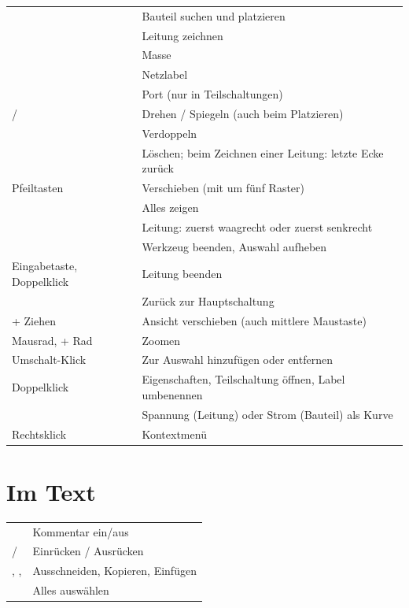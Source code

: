 \begin{tabularx}{\textwidth}{@{}P{4.5cm}L@{}}
  \toprule
   & Bauteil suchen und platzieren \\
   & Leitung zeichnen \\
   & Masse \\
   & Netzlabel \\
   & Port (nur in Teilschaltungen) \\
   /  & Drehen / Spiegeln (auch beim Platzieren) \\
   & Verdoppeln \\
   & Löschen; beim Zeichnen einer Leitung: letzte Ecke zurück \\
  Pfeiltasten & Verschieben (mit  um fünf Raster) \\
   & Alles zeigen \\
  \taste{/} & Leitung: zuerst waagrecht oder zuerst senkrecht \\
   & Werkzeug beenden, Auswahl aufheben \\
  Eingabetaste, Doppelklick & Leitung beenden \\
   & Zurück zur Hauptschaltung \\
   + Ziehen & Ansicht verschieben (auch mittlere Maustaste) \\
  Mausrad,  + Rad & Zoomen \\
  Umschalt-Klick & Zur Auswahl hinzufügen oder entfernen \\
  Doppelklick & Eigenschaften, Teilschaltung öffnen, Label umbenennen \\
   & Spannung (Leitung) oder Strom (Bauteil) als Kurve \\
  Rechtsklick & Kontextmenü \\
  \bottomrule
\end{tabularx}

\section*{Im Text}

\begin{tabularx}{\textwidth}{@{}P{4.5cm}L@{}}
  \toprule
   & Kommentar ein/aus \\
   /  & Einrücken / Ausrücken \\
  , ,  & Ausschneiden, Kopieren, Einfügen \\
   & Alles auswählen \\
  \bottomrule
\end{tabularx}

